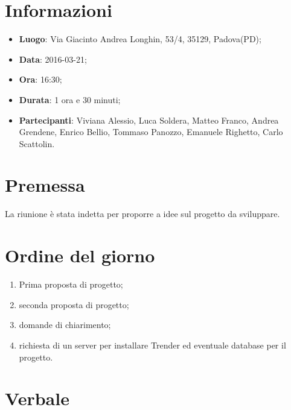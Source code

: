 \documentclass[a4paper,titlepage]{article}
\begin{document}
\maketitle

\newpage
\tableofcontents

\newpage
\section{Informazioni}
\label{sec:Informazioni}

\begin{itemize}
  \item \textbf{Luogo}: Via Giacinto Andrea Longhin, 53/4, 35129, Padova(PD);
  \item \textbf{Data}: 2016-03-21;
  \item \textbf{Ora}: 16:30;
  \item \textbf{Durata}: 1 ora e 30 minuti;
  \item \textbf{Partecipanti}: Viviana Alessio, Luca Soldera, Matteo Franco, Andrea Grendene, Enrico Bellio, Tommaso Panozzo, Emanuele Righetto, Carlo Scattolin.
\end{itemize}

\newpage
\section{Premessa}

La riunione è stata indetta per proporre a \PROPONENTE{} idee sul progetto da sviluppare.

\section{Ordine del giorno}
\label{sec:OrdineDelGiorno}

\begin{enumerate}
  \item Prima proposta di progetto;
  \item seconda proposta di progetto;
  \item domande di chiarimento;
  \item richiesta di un server per installare Trender ed eventuale database per il progetto.
\end{enumerate}

\newpage
\section{Verbale}
\label{sec:Verbale}
\end{document}
